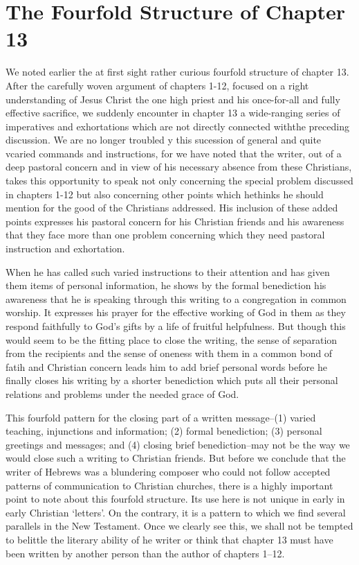 \newpage
\section{The Fourfold Structure of Chapter 13}
We noted earlier the at first sight rather curious fourfold structure of chapter
13.
After the carefully woven argument of chapters 1-12, focused on a right
understanding of Jesus Christ the one high priest and his once-for-all and fully
effective sacrifice, we suddenly encounter in chapter 13 a wide-ranging series
of imperatives and exhortations which are not directly connected withthe
preceding discussion.
We are no longer troubled y this sucession of general and quite vcaried commands
and instructions, for we have noted that the writer, out of a deep pastoral
concern and in view of his necessary absence from these Christians, takes this
opportunity to speak not only concerning the special problem discussed in
chapters 1-12 but also concerning other points which hethinks he should mention
for the good of the Christians addressed.
His inclusion of these added points expresses his pastoral concern for his
Christian friends and his awareness that they face more than one problem
concerning which they need pastoral instruction and exhortation.
\newline

When he has called such varied instructions to their attention and has given
them items of personal information, he shows by the formal benediction his
awareness that he is speaking through this writing to a congregation in common
worship.
It expresses his prayer for the effective working of God in them as they respond
faithfully to God's gifts by a life of fruitful helpfulness.
But though this would seem to be the fitting place to close the writing, the
sense of separation from the recipients and the sense of oneness with them in a
common bond of fatih and Christian concern leads him to add brief personal words
before he finally closes his writing by a shorter benediction which puts all
their personal relations and problems under the needed grace of God.
\newline

This fourfold pattern for the closing part of a written message--(1) varied
teaching, injunctions and information; (2) formal benediction; (3) personal
greetings and messages; and (4) closing brief benediction--may not be the way we
would close such a writing to Christian friends.
But before we conclude that the writer of Hebrews was a blundering composer who
could not follow accepted patterns of communication to Christian churches, there
is a highly important point to note about this fourfold structure.
Its use here is not unique in early in early Christian `letters'.
On the contrary, it is a pattern to which we find several parallels in the New
Testament.
Once we clearly see this, we shall not be tempted to belittle the literary
ability of he writer or think that chapter 13 must have been written by another
person than the author of chapters 1--12.
\newline

